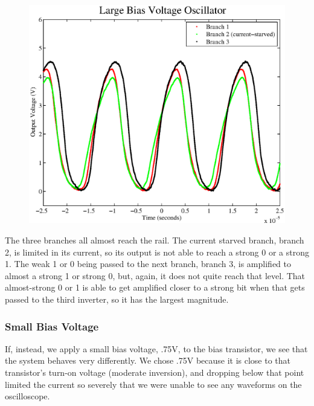 \documentclass{article}
\begin{document}
\begin{figure}[H]
\centering
\includegraphics[scale=.6]{large_bias.eps}
\caption{}
\label{largeBias}
\end{figure}

The three branches all almost reach the rail.  The current starved branch, branch 2, is limited in its current, so its output is not able to reach a strong 0 or a strong 1.  The weak 1 or 0 being passed to the next branch, branch 3, is amplified to almost a strong 1 or strong 0, but, again, it does not quite reach that level.  That almost-strong 0 or 1 is able to get amplified closer to a strong bit when that gets passed to the third inverter, so it has the largest magnitude.

\subsubsection*{Small Bias Voltage}

If, instead, we apply a small bias voltage, .75V, to the bias transistor, we see that the system behaves very differently.  We chose .75V because it is close to that transistor's turn-on voltage (moderate inversion), and dropping below that point limited the current so severely that we were unable to see any waveforms on the oscilloscope.
\end{document}
